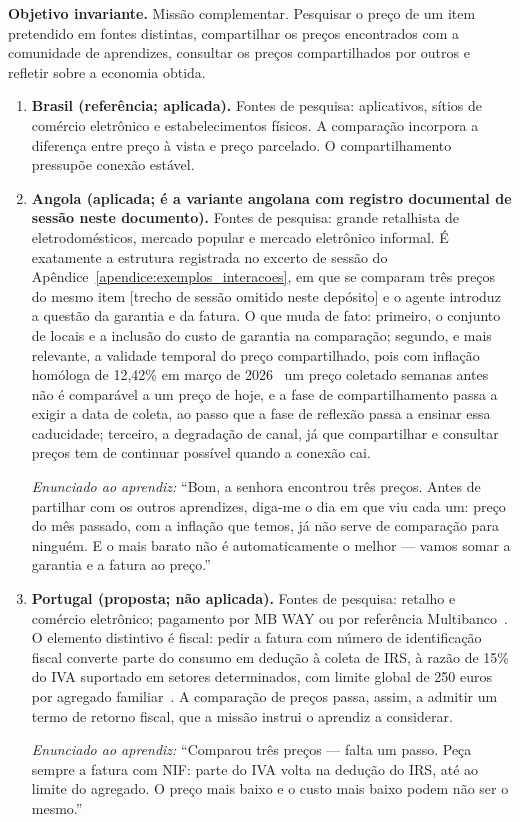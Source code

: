 \noindent\textbf{Objetivo invariante.} Missão complementar. Pesquisar o preço de um item pretendido em fontes distintas, compartilhar os preços encontrados com a comunidade de aprendizes, consultar os preços compartilhados por outros e refletir sobre a economia obtida.

\begin{enumerate}
\item[(a)] \textbf{Brasil (referência; aplicada).} Fontes de pesquisa: aplicativos, sítios de comércio eletrônico e estabelecimentos físicos. A comparação incorpora a diferença entre preço à vista e preço parcelado. O compartilhamento pressupõe conexão estável.

\item[(b)] \textbf{Angola (aplicada; é a variante angolana com registro documental de sessão neste documento).} Fontes de pesquisa: grande retalhista de eletrodomésticos, mercado popular e mercado eletrônico informal. É exatamente a estrutura registrada no excerto de sessão do Apêndice~\ref{apendice:exemplos_interacoes}, em que se comparam três preços do mesmo item [trecho de sessão omitido neste depósito] e o agente introduz a questão da garantia e da fatura. O que muda de fato: primeiro, o conjunto de locais e a inclusão do custo de garantia na comparação; segundo, e mais relevante, a validade temporal do preço compartilhado, pois com inflação homóloga de 12,42\% em março de 2026~\cite{ineangola2026ipcn} um preço coletado semanas antes não é comparável a um preço de hoje, e a fase de compartilhamento passa a exigir a data de coleta, ao passo que a fase de reflexão passa a ensinar essa caducidade; terceiro, a degradação de canal, já que compartilhar e consultar preços tem de continuar possível quando a conexão cai.

\noindent\textit{Enunciado ao aprendiz:} ``Bom, a senhora encontrou três preços. Antes de partilhar com os outros aprendizes, diga-me o dia em que viu cada um: preço do mês passado, com a inflação que temos, já não serve de comparação para ninguém. E o mais barato não é automaticamente o melhor --- vamos somar a garantia e a fatura ao preço.''

\item[(c)] \textbf{Portugal (proposta; não aplicada).} Fontes de pesquisa: retalho e comércio eletrônico; pagamento por MB WAY ou por referência Multibanco~\cite{sibs_mbway,sibs_multibanco}. O elemento distintivo é fiscal: pedir a fatura com número de identificação fiscal converte parte do consumo em dedução à coleta de IRS, à razão de 15\% do IVA suportado em setores determinados, com limite global de 250 euros por agregado familiar~\cite{at2026efatura}. A comparação de preços passa, assim, a admitir um termo de retorno fiscal, que a missão instrui o aprendiz a considerar.

\noindent\textit{Enunciado ao aprendiz:} ``Comparou três preços --- falta um passo. Peça sempre a fatura com NIF: parte do IVA volta na dedução do IRS, até ao limite do agregado. O preço mais baixo e o custo mais baixo podem não ser o mesmo.''
\end{enumerate}

